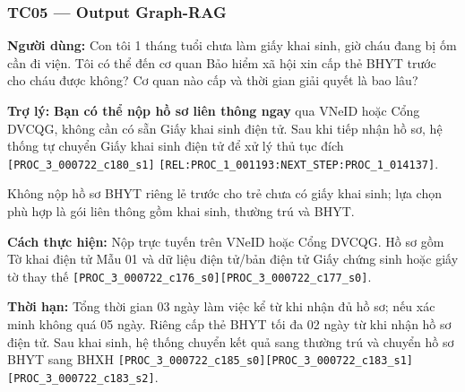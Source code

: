 \documentclass[11pt,a4paper]{article}
\newcommand{\src}[1]{\texttt{#1}}
\begin{document}
\subsubsection*{TC05 --- Output Graph-RAG}
\begin{questionbox}
\textbf{Người dùng:} Con tôi 1 tháng tuổi chưa làm giấy khai sinh, giờ cháu đang bị ốm cần đi viện. Tôi có thể đến cơ quan Bảo hiểm xã hội xin cấp thẻ BHYT trước cho cháu được không? Cơ quan nào cấp và thời gian giải quyết là bao lâu?
\end{questionbox}
\begin{answerbox}
\textbf{Trợ lý:} \textbf{Bạn có thể nộp hồ sơ liên thông ngay} qua VNeID hoặc Cổng DVCQG, không cần có sẵn Giấy khai sinh điện tử. Sau khi tiếp nhận hồ sơ, hệ thống tự chuyển Giấy khai sinh điện tử để xử lý thủ tục đích \src{[PROC\_3\_000722\_c180\_s1]} \src{[REL:PROC\_1\_001193:NEXT\_STEP:PROC\_1\_014137]}.

Không nộp hồ sơ BHYT riêng lẻ trước cho trẻ chưa có giấy khai sinh; lựa chọn phù hợp là gói liên thông gồm khai sinh, thường trú và BHYT.

\textbf{Cách thực hiện:} Nộp trực tuyến trên VNeID hoặc Cổng DVCQG. Hồ sơ gồm Tờ khai điện tử Mẫu 01 và dữ liệu điện tử/bản điện tử Giấy chứng sinh hoặc giấy tờ thay thế \src{[PROC\_3\_000722\_c176\_s0][PROC\_3\_000722\_c177\_s0]}.

\textbf{Thời hạn:} Tổng thời gian 03 ngày làm việc kể từ khi nhận đủ hồ sơ; nếu xác minh không quá 05 ngày. Riêng cấp thẻ BHYT tối đa 02 ngày từ khi nhận hồ sơ điện tử. Sau khai sinh, hệ thống chuyển kết quả sang thường trú và chuyển hồ sơ BHYT sang BHXH \src{[PROC\_3\_000722\_c185\_s0][PROC\_3\_000722\_c183\_s1][PROC\_3\_000722\_c183\_s2]}.
\end{answerbox}
\end{document}
